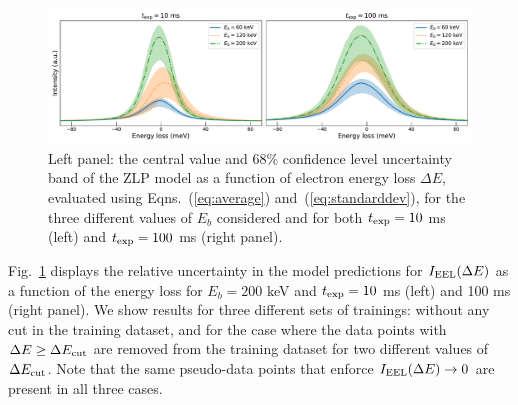 \begin{figure}[t]
    \centering
    \includegraphics[width=170mm]{plots/deltaE_dependence_vacuum.pdf}
    \caption{Left panel: the central value and 68\% confidence level uncertainty band of the ZLP model as a function
      of electron energy loss $\Delta E$,
      evaluated using Eqns.~(\ref{eq:average}) and~(\ref{eq:standarddev}), for
      the three different values of $E_b$ considered and for both
      $t_{\rm exp}=10$ ms (left)  and $t_{\rm exp}=100$ ms (right panel).
      \label{fig:EELS_vacuum_DeltaE}}
\end{figure}

Fig.~\ref{fig:EELS_vacuum_DeltaE} displays
the relative uncertainty in the model predictions for $I_{\rm EEL}(\Delta E)$
as a function of the energy loss for $E_b=200$ keV and $t_{\rm exp}=10$ ms (left)
and 100 ms (right panel).
%
We show results for three different sets of trainings: without any cut
in the training dataset, and for the case where the data points with $\Delta E \ge \Delta E_{\rm cut}$
are removed from the training dataset for two different values
of $\Delta E_{\rm cut}$.
%
Note that the same pseudo-data points that enforce $I_{\rm EEL}(\Delta E)\to 0$ are present
in all three cases.

